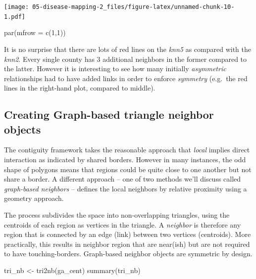 \documentclass[
]{book}
\newenvironment{Shaded}{\begin{snugshade}}{\end{snugshade}}
\newcommand{\AttributeTok}[1]{\textcolor[rgb]{0.77,0.63,0.00}{#1}}
\newcommand{\DecValTok}[1]{\textcolor[rgb]{0.00,0.00,0.81}{#1}}
\newcommand{\FunctionTok}[1]{\textcolor[rgb]{0.00,0.00,0.00}{#1}}
\newcommand{\NormalTok}[1]{#1}
\newcommand{\OtherTok}[1]{\textcolor[rgb]{0.56,0.35,0.01}{#1}}
\begin{document}
\texttt{[image: 05-disease-mapping-2\_files/figure-latex/unnamed-chunk-10-1.pdf]}

\begin{Shaded}
\begin{Highlighting}[]
\FunctionTok{par}\NormalTok{(}\AttributeTok{mfrow =} \FunctionTok{c}\NormalTok{(}\DecValTok{1}\NormalTok{,}\DecValTok{1}\NormalTok{))}
\end{Highlighting}
\end{Shaded}

It is no surprise that there are lots of red lines on the \emph{knn5} as compared with the \emph{knn2}. Every single county has 3 additional neighbors in the former compared to the latter. However it is interesting to see how many initially \emph{asymmetric} relationships had to have added links in order to enforce \emph{symmetry} (e.g.~the red lines in the right-hand plot, compared to middle).

\hypertarget{creating-graph-based-triangle-neighbor-objects}{%
\subsection{Creating Graph-based triangle neighbor objects}\label{creating-graph-based-triangle-neighbor-objects}}

The contiguity framework takes the reasonable approach that \emph{local} implies direct interaction as indicated by shared borders. However in many instances, the odd shape of polygons means that regions could be quite close to one another but not share a border. A different approach -- one of two methods we'll discuss called \emph{graph-based neighbors} -- defines the local neighbors by relative proximity using a geometry approach.

The process subdivides the space into non-overlapping triangles, using the centroids of each region as vertices in the triangle. A \emph{neighbor} is therefore any region that is connected by an edge (link) between two vertices (centroids). More practically, this results in neighbor region that are near(ish) but are not required to have touching-borders. Graph-based neighbor objects are symmetric by design.

\begin{Shaded}
\begin{Highlighting}[]
\NormalTok{tri\_nb }\OtherTok{\textless{}{-}} \FunctionTok{tri2nb}\NormalTok{(ga\_cent)}
\FunctionTok{summary}\NormalTok{(tri\_nb)}
\end{Highlighting}
\end{Shaded}
\end{document}
